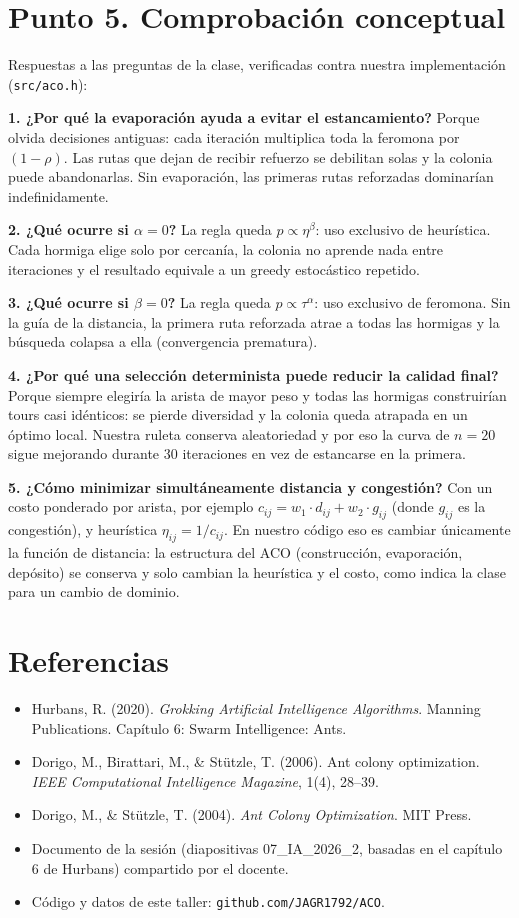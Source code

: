 \documentclass[12pt,a4paper]{article}
\begin{document}
\section{Punto 5. Comprobación conceptual}

Respuestas a las preguntas de la clase, verificadas contra nuestra
implementación (\texttt{src/aco.h}):

\textbf{1. ¿Por qué la evaporación ayuda a evitar el estancamiento?}
Porque olvida decisiones antiguas: cada iteración multiplica toda la feromona
por $(1 - \rho)$. Las rutas que dejan de recibir refuerzo se debilitan solas y
la colonia puede abandonarlas. Sin evaporación, las primeras rutas reforzadas
dominarían indefinidamente.

\textbf{2. ¿Qué ocurre si $\alpha = 0$?}
La regla queda $p \propto \eta^{\beta}$: uso exclusivo de heurística. Cada
hormiga elige solo por cercanía, la colonia no aprende nada entre iteraciones
y el resultado equivale a un greedy estocástico repetido.

\textbf{3. ¿Qué ocurre si $\beta = 0$?}
La regla queda $p \propto \tau^{\alpha}$: uso exclusivo de feromona. Sin la
guía de la distancia, la primera ruta reforzada atrae a todas las hormigas y
la búsqueda colapsa a ella (convergencia prematura).

\textbf{4. ¿Por qué una selección determinista puede reducir la calidad final?}
Porque siempre elegiría la arista de mayor peso y todas las hormigas
construirían tours casi idénticos: se pierde diversidad y la colonia queda
atrapada en un óptimo local. Nuestra ruleta conserva aleatoriedad y por eso la
curva de $n = 20$ sigue mejorando durante 30 iteraciones en vez de
estancarse en la primera.

\textbf{5. ¿Cómo minimizar simultáneamente distancia y congestión?}
Con un costo ponderado por arista, por ejemplo
$c_{ij} = w_1 \cdot d_{ij} + w_2 \cdot g_{ij}$ (donde $g_{ij}$ es la
congestión), y heurística $\eta_{ij} = 1/c_{ij}$. En nuestro código eso es
cambiar únicamente la función de distancia: la estructura del ACO
(construcción, evaporación, depósito) se conserva y solo cambian la
heurística y el costo, como indica la clase para un cambio de dominio.

\section{Referencias}

\begin{itemize}
\item Hurbans, R. (2020). \textit{Grokking Artificial Intelligence Algorithms}.
Manning Publications. Capítulo 6: Swarm Intelligence: Ants.
\item Dorigo, M., Birattari, M., \& Stützle, T. (2006). Ant colony
optimization. \textit{IEEE Computational Intelligence Magazine}, 1(4), 28--39.
\item Dorigo, M., \& Stützle, T. (2004). \textit{Ant Colony Optimization}.
MIT Press.
\item Documento de la sesión (diapositivas 07\_IA\_2026\_2, basadas en el
capítulo 6 de Hurbans) compartido por el docente.
\item Código y datos de este taller: \texttt{github.com/JAGR1792/ACO}.
\end{itemize}
\end{document}
